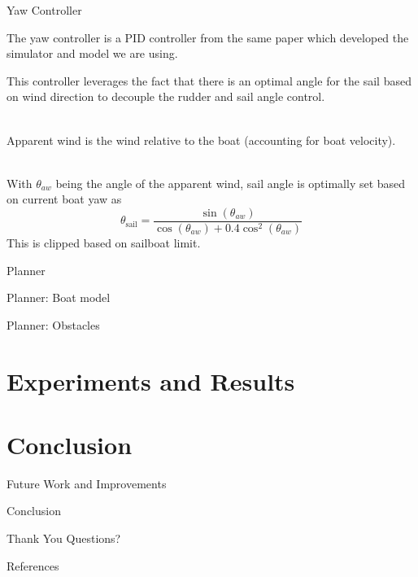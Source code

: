 \documentclass[10pt,xcolor={table,dvipsnames},t]{beamer}
\begin{document}
\begin{frame}{Yaw Controller}

The yaw controller is a PID controller from the same paper which developed the simulator and 
model we are using\cite{Buehler2018}.

This controller leverages the fact that there is an optimal angle for the sail based on wind direction to decouple the rudder and sail angle control.

\hfill\\
Apparent wind is the wind relative to the boat (accounting for boat velocity).

\hfill\\
With \(\theta_{aw}\) being the angle of the apparent wind, sail angle is optimally set based on current boat yaw as 
\begin{equation}
    \theta_{\text{sail}} = \frac{\sin(\theta_{aw})}{\cos(\theta_{aw}) + 0.4\cos^2(\theta_{aw})}
\end{equation}
This is clipped based on sailboat limit.
    
\end{frame}

\begin{frame}{Planner}
    
\end{frame}

\begin{frame}{Planner: Boat model}

\end{frame}

\begin{frame}{Planner: Obstacles}

\end{frame}

\section{Experiments and Results}

\section{Conclusion}

\begin{frame}{Future Work and Improvements}
    
\end{frame}

\begin{frame}{Conclusion}
    
\end{frame}

\begin{frame}{Thank You}
    Questions?
\end{frame}


\begin{frame}{References}
    \printbibliography{}
\end{frame}
\end{document}
